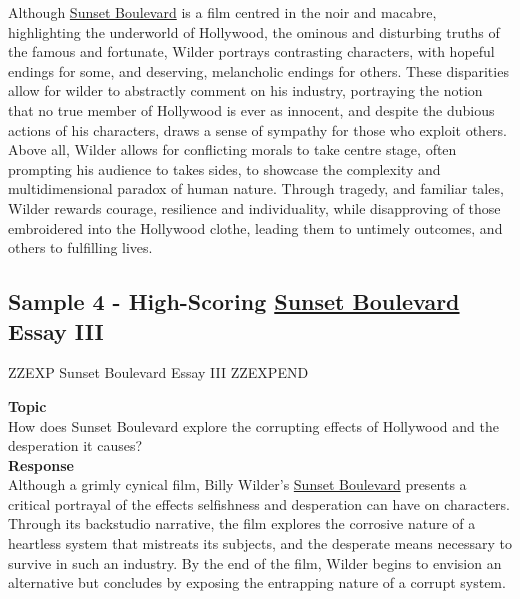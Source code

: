 \documentclass[a4paper]{article}
\begin{document}
Although \underline{Sunset Boulevard} is a film centred in the noir and macabre, highlighting the underworld of Hollywood, the ominous and disturbing truths of the famous and fortunate, Wilder portrays contrasting characters, with hopeful endings for some, and deserving, melancholic endings for others. These disparities allow for wilder to abstractly comment on his industry, portraying the notion that no true member of Hollywood is ever as innocent, and despite the dubious actions of his characters, draws a sense of sympathy for those who exploit others. Above all, Wilder allows for conflicting morals to take centre stage, often prompting his audience to takes sides, to showcase the complexity and multidimensional paradox of human nature. Through tragedy, and familiar tales, Wilder rewards courage, resilience and individuality, while disapproving of those embroidered into the Hollywood clothe, leading them to untimely outcomes, and others to fulfilling lives.\\
\newpage

\newpage
\subsection{Sample 4 - High-Scoring \underline{Sunset Boulevard} Essay III}


ZZEXP Sunset Boulevard Essay III ZZEXPEND


\textbf{Topic}\\
How does Sunset Boulevard explore the corrupting effects of Hollywood and the desperation it causes?\\

\textbf{Response}\\
Although a grimly cynical film, Billy Wilder’s \underline{Sunset Boulevard} presents a critical portrayal of the effects selfishness and desperation can have on characters. Through its backstudio narrative, the film explores the corrosive nature of a heartless system that mistreats its subjects, and the desperate means necessary to survive in such an industry. By the end of the film, Wilder begins to envision an alternative but concludes by exposing the entrapping nature of a corrupt system.\\
\end{document}
